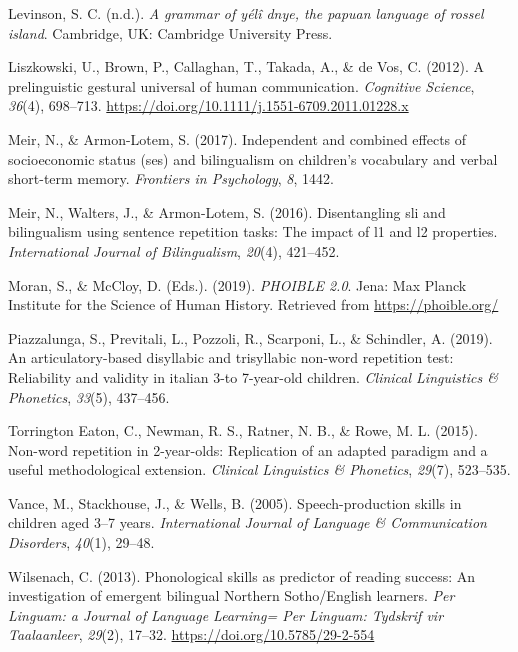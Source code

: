 \documentclass[english,,man,floatsintext]{apa6}
\begin{document}
\leavevmode\hypertarget{ref-levinsoninprepydgrammar}{}%
Levinson, S. C. (n.d.). \emph{A grammar of yélî dnye, the papuan language of rossel island}. Cambridge, UK: Cambridge University Press.

\leavevmode\hypertarget{ref-liszkowski2012prelinguistic}{}%
Liszkowski, U., Brown, P., Callaghan, T., Takada, A., \& de Vos, C. (2012). A prelinguistic gestural universal of human communication. \emph{Cognitive Science}, \emph{36}(4), 698--713. \url{https://doi.org/10.1111/j.1551-6709.2011.01228.x}

\leavevmode\hypertarget{ref-meir2017independent}{}%
Meir, N., \& Armon-Lotem, S. (2017). Independent and combined effects of socioeconomic status (ses) and bilingualism on children's vocabulary and verbal short-term memory. \emph{Frontiers in Psychology}, \emph{8}, 1442.

\leavevmode\hypertarget{ref-meir2016disentangling}{}%
Meir, N., Walters, J., \& Armon-Lotem, S. (2016). Disentangling sli and bilingualism using sentence repetition tasks: The impact of l1 and l2 properties. \emph{International Journal of Bilingualism}, \emph{20}(4), 421--452.

\leavevmode\hypertarget{ref-phoible}{}%
Moran, S., \& McCloy, D. (Eds.). (2019). \emph{PHOIBLE 2.0}. Jena: Max Planck Institute for the Science of Human History. Retrieved from \url{https://phoible.org/}

\leavevmode\hypertarget{ref-piazzalunga2019articulatory}{}%
Piazzalunga, S., Previtali, L., Pozzoli, R., Scarponi, L., \& Schindler, A. (2019). An articulatory-based disyllabic and trisyllabic non-word repetition test: Reliability and validity in italian 3-to 7-year-old children. \emph{Clinical Linguistics \& Phonetics}, \emph{33}(5), 437--456.

\leavevmode\hypertarget{ref-torrington2015non}{}%
Torrington Eaton, C., Newman, R. S., Ratner, N. B., \& Rowe, M. L. (2015). Non-word repetition in 2-year-olds: Replication of an adapted paradigm and a useful methodological extension. \emph{Clinical Linguistics \& Phonetics}, \emph{29}(7), 523--535.

\leavevmode\hypertarget{ref-vance2005speech}{}%
Vance, M., Stackhouse, J., \& Wells, B. (2005). Speech-production skills in children aged 3--7 years. \emph{International Journal of Language \& Communication Disorders}, \emph{40}(1), 29--48.

\leavevmode\hypertarget{ref-wilsenach2013phonological}{}%
Wilsenach, C. (2013). Phonological skills as predictor of reading success: An investigation of emergent bilingual Northern Sotho/English learners. \emph{Per Linguam: a Journal of Language Learning= Per Linguam: Tydskrif vir Taalaanleer}, \emph{29}(2), 17--32. \url{https://doi.org/10.5785/29-2-554}
\end{document}
